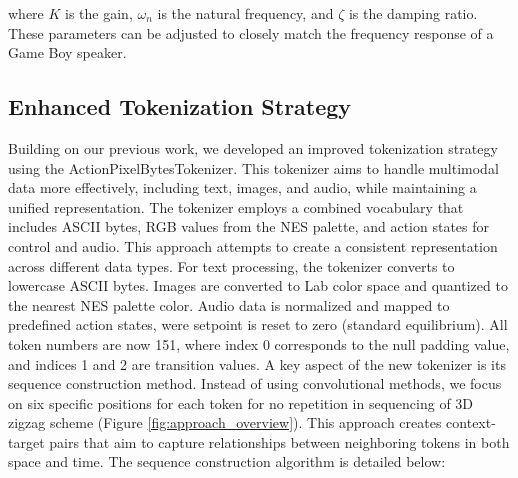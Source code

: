 \documentclass[10pt,a4paper]{article}
\begin{document}
where $K$ is the gain, $\omega_n$ is the natural frequency, and $\zeta$ is the damping ratio. These parameters can be adjusted to closely match the frequency response of a Game Boy speaker.

\subsection{Enhanced Tokenization Strategy}

Building on our previous work, we developed an improved tokenization strategy using the ActionPixelBytesTokenizer. This tokenizer aims to handle multimodal data more effectively, including text, images, and audio, while maintaining a unified representation. The tokenizer employs a combined vocabulary that includes ASCII bytes, RGB values from the NES palette, and action states for control and audio. This approach attempts to create a consistent representation across different data types. For text processing, the tokenizer converts to lowercase ASCII bytes. Images are converted to Lab color space and quantized to the nearest NES palette color. Audio data is normalized and mapped to predefined action states, were setpoint is reset to zero (standard equilibrium). All token numbers are now 151, where index 0 corresponds to the null padding value, and indices 1 and 2 are transition values. A key aspect of the new tokenizer is its sequence construction method. Instead of using convolutional methods, we focus on six specific positions for each token for no repetition in sequencing of 3D zigzag scheme (Figure \ref{fig:approach_overview}). This approach creates context-target pairs that aim to capture relationships between neighboring tokens in both space and time. The sequence construction algorithm is detailed below:
\end{document}
